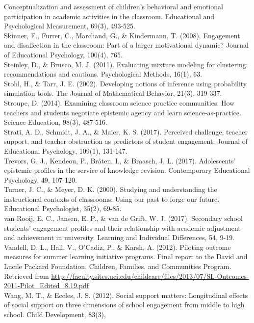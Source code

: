 \documentclass[]{book}
\theoremstyle{definition}
\theoremstyle{definition}
\theoremstyle{definition}
\theoremstyle{remark}
\begin{document}
Conceptualization and assessment of children's behavioral and emotional
participation in academic activities in the classroom. Educational and
Psychological Measurement, 69(3), 493-525.\\
Skinner, E., Furrer, C., Marchand, G., \& Kindermann, T. (2008).
Engagement and disaffection in the classroom: Part of a larger
motivational dynamic? Journal of Educational Psychology, 100(4), 765.\\
Steinley, D., \& Brusco, M. J. (2011). Evaluating mixture modeling for
clustering: recommendations and cautions. Psychological Methods, 16(1),
63.\\
Stohl, H., \& Tarr, J. E. (2002). Developing notions of inference using
probability simulation tools. The Journal of Mathematical Behavior,
21(3), 319-337.\\
Stroupe, D. (2014). Examining classroom science practice communities:
How teachers and students negotiate epistemic agency and learn
science‐as‐practice. Science Education, 98(3), 487-516.\\
Strati, A. D., Schmidt, J. A., \& Maier, K. S. (2017). Perceived
challenge, teacher support, and teacher obstruction as predictors of
student engagement. Journal of Educational Psychology, 109(1),
131-147.\\
Trevors, G. J., Kendeou, P., Bråten, I., \& Braasch, J. L. (2017).
Adolescents' epistemic profiles in the service of knowledge revision.
Contemporary Educational Psychology, 49, 107-120.\\
Turner, J. C., \& Meyer, D. K. (2000). Studying and understanding the
instructional contexts of classrooms: Using our past to forge our
future. Educational Psychologist, 35(2), 69-85.\\
van Rooij, E. C., Jansen, E. P., \& van de Grift, W. J. (2017).
Secondary school students' engagement profiles and their relationship
with academic adjustment and achievement in university. Learning and
Individual Differences, 54, 9-19.\\
Vandell, D. L., Hall, V., O'Cadiz, P., \& Karsh, A. (2012). Piloting
outcome measures for summer learning initiative programs. Final report
to the David and Lucile Packard Foundation, Children, Families, and
Communities Program. Retrieved from
\url{http://faculty.sites.uci.edu/childcare/files/2013/07/SL-Outcomes-2011-Pilot_Edited_8.19.pdf}\\
Wang, M. T., \& Eccles, J. S. (2012). Social support matters:
Longitudinal effects of social support on three dimensions of school
engagement from middle to high school. Child Development, 83(3),
\end{document}
